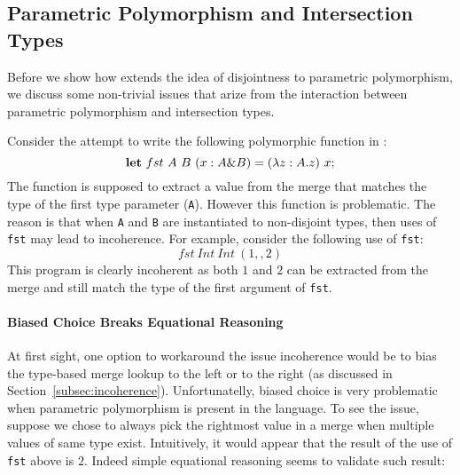 \subsection{Parametric Polymorphism and Intersection Types}\label{subsec:polymorphism}
Before we show how \name extends the idea of disjointness to parametric 
polymorphism, we discuss some non-trivial issues that arize from 
the interaction between parametric polymorphism and intersection types. 
\begin{comment}
Dunfield~\cite{} provides a
good illustrative example of the issues that arize when combining
disjoint intersection types and parametric polymorphism:
\[\lambda x. {\bf let}~y = 0 \mergeop x~{\bf in}~x\]
\end{comment}
Consider the attempt to write 
the following polymorphic function in \name:
\[{\bf let}~fst~A~B~(x : A \& B) = (\lambda z : A. z)~x;\] The
 function is supposed to extract a value from the merge that
matches the type of the first type parameter (\lstinline{A}).  However
this function is problematic.  The reason is that when
\lstinline{A} and \lstinline{B} are instantiated to non-disjoint
types, then uses of \lstinline{fst} may lead to incoherence.
For example, consider the following use of \lstinline{fst}:
\[fst~Int~Int~(1,,2)\]
\noindent This program is clearly incoherent as both 
$1$ and $2$ can be extracted from the merge and still match the type
of the first argument of \lstinline{fst}.

\paragraph{Biased Choice Breaks Equational Reasoning} At first sight, one option 
to workaround the issue incoherence would be to bias the type-based merge lookup 
to the left or to the right (as discussed in
Section~\ref{subsec:incoherence}). Unfortunatelly, biased choice is
very problematic when parametric polymorphism is present in the language.
To see the issue, suppose we chose to always pick the
rightmost value in a merge when multiple values of same type exist.
Intuitively, it would appear that the result of the use of
\lstinline{fst} above is $2$. Indeed simple equational reasoning
seems to validate such result:

